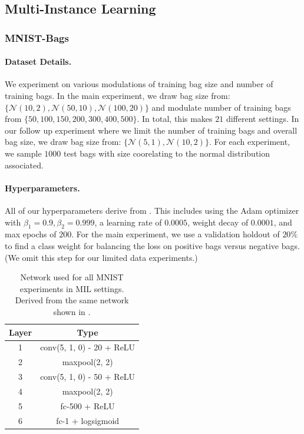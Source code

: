 \documentclass{article}
\begin{document}
\subsection{Multi-Instance Learning}
\subsubsection{MNIST-Bags}
\paragraph{Dataset Details.} We experiment on various modulations of training bag size and number of training bags. In the main experiment, we draw bag size from: $\{\mathcal{N}(10, 2), \mathcal{N}(50, 10), \mathcal{N}(100, 20)\}$ and modulate number of training bags from $\{50, 100, 150, 200, 300, 400, 500\}$. In total, this makes $21$ different settings. In our follow up experiment where we limit the number of training bags and overall bag size, we draw bag size from: $\{\mathcal{N}(5, 1), \mathcal{N}(10, 2)\}$. For each experiment, we sample $1000$ test bags with size coorelating to the normal distribution associated.

\paragraph{Hyperparameters.} All of our hyperparameters derive from \citet{ilse2018attention}. This includes using the Adam optimizer with $\beta_1 = 0.9, \beta_2 = 0.999$, a learning rate of $0.0005$, weight decay of $0.0001$, and max epochs of $200$. For the main experiment, we use a validation holdout of $20\%$ to find a class weight for balancing the loss on positive bags versus negative bags. (We omit this step for our limited data experiments.)
\begin{table}[h]
    \centering
    \caption{Network used for all MNIST experiments in MIL settings. Derived from the same network shown in \citet{ilse2018attention}.}
    \begin{tabular}{c|c}
        \toprule
         Layer & Type\\
         \midrule
         1 & conv(5, 1, 0) - 20 + ReLU\\
         2 & maxpool(2, 2)\\
         3 & conv(5, 1, 0) - 50 + ReLU\\
         4 & maxpool(2, 2)\\
         5 & fc-500 + ReLU\\
         6 & fc-1 + logsigmoid\\
        \bottomrule
    \end{tabular}

\end{table}
\end{document}
